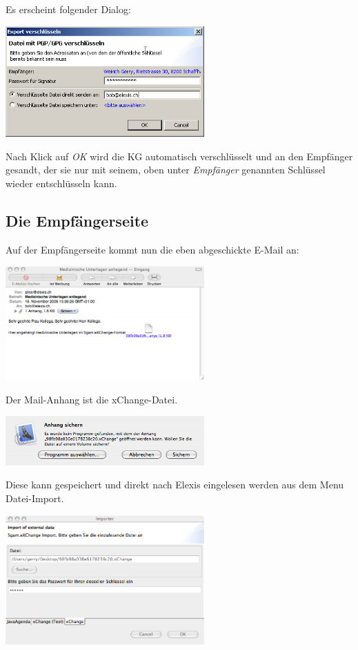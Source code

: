  Es erscheint folgender Dialog:

\includegraphics[width=3in]{images/xc4.png}

Nach Klick auf \textit{OK} wird die KG automatisch verschlüsselt und an den Empfänger gesandt, der sie nur mit seinem, oben unter \textit{Empfänger} genannten Schlüssel wieder entschlüsseln kann.

\subsection{Die Empfängerseite}
Auf der Empfängerseite kommt nun die eben abgeschickte E-Mail an:

\includegraphics[width=3in]{images/import1.png}

Der Mail-Anhang ist die xChange-Datei.

\includegraphics[width=3in]{images/import2.png}

Diese kann gespeichert und direkt nach Elexis eingelesen werden aus dem Menu Datei-Import.

\includegraphics[width=3in]{images/import3.png}



